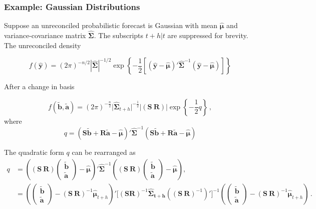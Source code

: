 \documentclass[a4paper, 11pt]{article}
\def\bt{\begin{pmatrix}\tilde{\bm{b}}\\[-0.2cm]\tilde{\bm{a}}\end{pmatrix}}
\theoremstyle{theo}
\theoremstyle{definition}
\begin{document}
\subsubsection*{Example: Gaussian Distributions}

Suppose an unreconciled probabilistic forecast is Gaussian with mean $\hat{\bm \mu}$ and variance-covariance matrix $\hat{\bm \Sigma}$.  The subscripts $t+h|t$ are suppressed for brevity.  The unreconciled density

\begin{equation}
  f(\hat{\bm{y}})=(2\pi)^{-n/2}|\hat{\bm{\Sigma}}|^{-1/2}\exp\left\{-\frac{1}{2}\left[(\hat{\bm y}-\hat{\bm \mu})'\hat{\bm{\Sigma}}^{-1}(\hat{\bm y}-\hat{\bm \mu})\right]\right\}
\end{equation}

After a change in basis

\begin{equation}
f(\tilde{\bm b},\tilde{\bm a})=(2\pi)^{-\frac{n}{2}}\Big|\bm{\hat{\Sigma}}_{t+h}\Big|^{-\frac{1}{2}}\Big|(\bm{S} ~  \bm{R})\Big|\exp\left\{-\frac{1}{2}q\right\}\,,
\end{equation}
where
\begin{equation}
q=(\bm{S}\tilde{\bm{b}}+\bm{R}\tilde{\bm{a}}-\bm{\hat{\mu}})' \bm{\hat{\Sigma}}^{-1}(\bm{S}\tilde{\bm{b}}+\bm{R}\tilde{\bm{a}}-\bm{\hat{\mu}})
\end{equation}


The quadratic form $q$ can be rearranged as
\begin{align*}
q& = 
\left((\bm{S} ~  \bm{R})\bt-\bm{\hat{\mu}}\right)' \bm{\hat{\Sigma}}^{-1}\left((\bm{S} ~ \bm{R})\bt-\bm{\hat{\mu}}\right),\\
& =
\left(\bt-(\bm{S} ~ \bm{R})^{-1}\bm{\hat{\mu}}_{t+h}\right)' \Big[(\bm{S}  \bm{R})^{-1}\bm{\hat{\Sigma}_{t+h}}\left((\bm{S} ~ \bm{R})^{-1}\right)'\Big]^{-1}
\left(\bt-(\bm{S} ~ \bm{R})^{-1}\bm{\hat{\mu}}_{t+h}\right)\,.
\end{align*}
\end{document}

